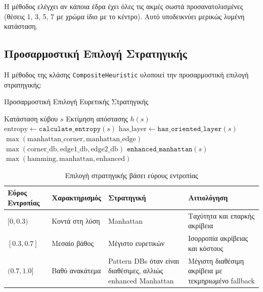 Η μέθοδος  ελέγχει αν κάποια έδρα έχει όλες τις ακμές σωστά προσανατολισμένες (θέσεις 1, 3, 5, 7 με χρώμα ίδιο με το κέντρο). Αυτό υποδεικνύει μερικώς λυμένη κατάσταση.

\subsection{Προσαρμοστική Επιλογή Στρατηγικής}
\label{subsec:adaptive-strategy}

Η μέθοδος  της κλάσης \texttt{CompositeHeuristic} υλοποιεί την προσαρμοστική επιλογή στρατηγικής:

\begin{algorithm}[H]
\caption{Προσαρμοστική Επιλογή Ευρετικής Στρατηγικής}
\label{alg:adaptive-selection}
\begin{algorithmic}[1]
\Require Κατάσταση κύβου $s$
\Ensure Εκτίμηση απόστασης $h(s)$
\State $\text{entropy} \gets \texttt{calculate\_entropy}(s)$
\State $\text{has\_layer} \gets \texttt{has\_oriented\_layer}(s)$
    \State \Return $\max(\text{manhattan\_corner}, \text{manhattan\_edge})$
        \State \Return $\max(\text{corner\_db}, \text{edge1\_db}, \text{edge2\_db})$
    \Else
        \State \Return $\texttt{enhanced\_manhattan}(s)$
    \EndIf
\Else
    \State \Return $\max(\text{hamming}, \text{manhattan}, \text{enhanced})$
\EndIf
\end{algorithmic}
\end{algorithm}

\begin{table}[htbp]
\centering
\caption{Επιλογή στρατηγικής βάσει εύρους εντροπίας}
\label{tab:strategy-selection}
\small
\begin{tabularx}{\textwidth}{>{\RaggedRight\arraybackslash}p{2.6cm} >{\RaggedRight\arraybackslash}p{2.8cm} >{\RaggedRight\arraybackslash}p{2.8cm} Y}
\toprule
\textbf{Εύρος Εντροπίας} & \textbf{Χαρακτηρισμός} & \textbf{Στρατηγική} & \textbf{Αιτιολόγηση} \\
\midrule
$[0, 0.3)$ & Κοντά στη λύση & Manhattan & Ταχύτητα και επαρκής ακρίβεια \\
$[0.3, 0.7]$ & Μεσαίο βάθος & Μέγιστο ευρετικών & Ισορροπία ακρίβειας και κόστους \\
$(0.7, 1.0]$ & Βαθύ ανακάτεμα & Pattern DBs όταν είναι διαθέσιμες, αλλιώς enhanced Manhattan & Μέγιστη διαθέσιμη ακρίβεια με τεκμηριωμένο fallback \\
\bottomrule
\end{tabularx}
\end{table}

